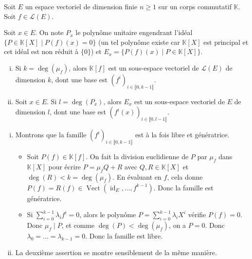 




	
	Soit $E$ un espace vectoriel de dimension finie $n \geq 1$ sur un corps commutatif $\mathbb{K}$. Soit $f \in \mathcal{L}(E)$.
	
	\begin{notation}
		Soit $x \in E$. On note $P_x$ le polynôme unitaire engendrant l'idéal $\{ P \in \mathbb{K}[X] \mid P(f)(x) = 0 \}$ (un tel polynôme existe car $\mathbb{K}[X]$ est principal et cet idéal est non réduit à $\{ 0 \}$) et $E_x = \{ P(f)(x) \mid P \in \mathbb{K}[X] \}$.
	\end{notation}

	\begin{lemma}
		\label{invariants-similitude-1}
		\begin{enumerate}[(i)]
			\item Si $k = \deg(\mu_f)$, alors $\mathbb{K}[f]$ est un sous-espace vectoriel de $\mathcal{L}(E)$ de dimension $k$, dont une base est $(f^i)_{i \in \llbracket 0, k-1 \rrbracket}$.
			\item Soit $x \in E$. Si $l = \deg(P_x)$, alors $E_x$ est un sous-espace vectoriel de $E$ de dimension $l$, dont une base est $(f^i(x))_{i \in \llbracket 0, l-1 \rrbracket}$.
		\end{enumerate}
	\end{lemma}


	\begin{demonstration}
		\begin{enumerate}[(i)]
			\item Montrons que la famille $(f^i)_{i \in \llbracket 0, k-1 \rrbracket}$ est à la fois libre et génératrice.
			\begin{itemize}
				\item Soit $P(f) \in \mathbb{K}[f]$. On fait la division euclidienne de $P$ par $\mu_f$ dans $\mathbb{K}[X]$ pour écrire $P = \mu_f Q + R$ avec $Q, R \in \mathbb{K}[X]$ et $\deg(R) < k = \deg(\mu_f)$. En évaluant en $f$, cela donne $P(f) = R(f) \in \operatorname{Vect}(\operatorname{id}_E, \dots, f^{k-1})$. Donc la famille est génératrice.
				\item Si $\sum_{i=0}^{k-1} \lambda_i f^i = 0$, alors le polynôme $P = \sum_{i=0}^{k-1} \lambda_i X^i$ vérifie $P(f) = 0$. Donc $\mu_f \mid P$, et comme $\deg(P) < \deg(\mu_f)$, on a $P = 0$. Donc $\lambda_0 = \dots = \lambda_{k-1} = 0$. Donc la famille est libre.
			\end{itemize}
			\item La deuxième assertion se montre sensiblement de la même manière.
		\end{enumerate}
	\end{demonstration}

